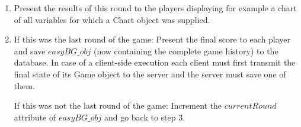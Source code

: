 \begin{enumerate}
Some games need incomplete information, which means the players have to be prevented in general from using the Javascript console in order to debug into the calculation process and check variable values. Client-side code can be rendered unreadable using code obfuscators\footnote{http://yuiblog.com/blog/2006/03/06/minification-v-obfuscation/ retrieved on 24 Jan. 2016}. A BGE implementation is a big project, even an experienced Javascript developer would need a long time to find the calculation process in such an obfuscated code. Additionally, techniques exist to completely disable the User's Javascript console\footnote{http://www.queness.com/post/16151/disable-javascript-console-in-browsers, retrieved on 24 Jan. 2016}.

\item Present the results of this round to the players displaying for example a chart of all variables for which a Chart object was supplied.
\item If this was the last round of the game: Present the final score to each player and save  $easyBG\_obj$ (now containing the complete game history) to the database. In case of a client-side execution each client must first transmit the final state of its Game object to the server and the server must save one of them.

If this was not the last round of the game: Increment the $currentRound$ attribute of $easyBG\_obj$ and go back to step 3.
\end{enumerate}


